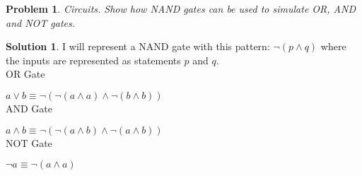 \documentclass{article}
\newtheorem{problem}{Problem}
\theoremstyle{definition}
\newtheorem*{solution}{Solution}
\begin{document}
\begin{problem}

Circuits. Show how NAND gates can be used to simulate OR, AND and NOT gates.

\end{problem}

\begin{solution}

I will represent a NAND gate with this pattern: \( \neg ( p \wedge q ) \) where the inputs are represented as statements \(p\) and \(q\). \\

OR Gate

\(a \vee b \equiv \neg (\neg (a \wedge a) \wedge \neg (b \wedge b) ) \) \\

AND Gate

\(a \wedge b \equiv \neg (\neg (a \wedge b) \wedge \neg (a \wedge b) ) \) \\

NOT Gate

\(\neg a \equiv \neg (a \wedge a) \)

\end{solution}
\end{document}
